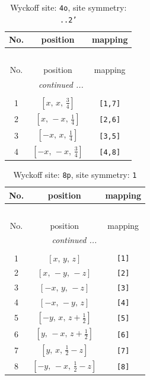 \documentclass[fleqn,8pt]{jsarticle}
\begin{document}
\renewcommand{\arraystretch}{1.2}
\begin{longtable}{ccc}
\caption{Wyckoff site: {\tt 4o}, site symmetry: {\tt ..2'}}
 \\
 \hline \hline
No. & position & mapping \\ \hline \endfirsthead

\multicolumn{2}{l}{\tablename\ \thetable{}} \\
 \hline \hline
No. & position & mapping \\ \hline \endhead

 \hline \hline
\multicolumn{2}{r}{\footnotesize\it continued ...} \\ \endfoot

 \hline \hline
\multicolumn{2}{r}{} \\ \endlastfoot

1 & $\left[ x,\, x,\, \frac{3}{4} \right]$ & {\tt [1,7]} \\ \hline
2 & $\left[ x,\, - x,\, \frac{1}{4} \right]$ & {\tt [2,6]} \\ \hline
3 & $\left[ - x,\, x,\, \frac{1}{4} \right]$ & {\tt [3,5]} \\ \hline
4 & $\left[ - x,\, - x,\, \frac{3}{4} \right]$ & {\tt [4,8]} \\
\end{longtable}
\renewcommand{\arraystretch}{1.2}
\begin{longtable}{ccc}
\caption{Wyckoff site: {\tt 8p}, site symmetry: {\tt 1}}
 \\
 \hline \hline
No. & position & mapping \\ \hline \endfirsthead

\multicolumn{2}{l}{\tablename\ \thetable{}} \\
 \hline \hline
No. & position & mapping \\ \hline \endhead

 \hline \hline
\multicolumn{2}{r}{\footnotesize\it continued ...} \\ \endfoot

 \hline \hline
\multicolumn{2}{r}{} \\ \endlastfoot

1 & $\left[ x,\, y,\, z \right]$ & {\tt [1]} \\ \hline
2 & $\left[ x,\, - y,\, - z \right]$ & {\tt [2]} \\ \hline
3 & $\left[ - x,\, y,\, - z \right]$ & {\tt [3]} \\ \hline
4 & $\left[ - x,\, - y,\, z \right]$ & {\tt [4]} \\ \hline
5 & $\left[ - y,\, x,\, z + \frac{1}{2} \right]$ & {\tt [5]} \\ \hline
6 & $\left[ y,\, - x,\, z + \frac{1}{2} \right]$ & {\tt [6]} \\ \hline
7 & $\left[ y,\, x,\, \frac{1}{2} - z \right]$ & {\tt [7]} \\ \hline
8 & $\left[ - y,\, - x,\, \frac{1}{2} - z \right]$ & {\tt [8]} \\
\end{longtable}
\end{document}
